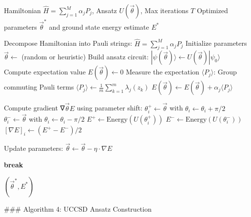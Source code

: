 \begin{algorithm}
\caption{Variational Quantum Eigensolver (VQE) with Parameter Shift Gradients}
\begin{algorithmic}[1]
\REQUIRE Hamiltonian $\hat{H} = \sum_{j=1}^M \alpha_j P_j$, Ansatz $U(\vec{\theta})$, Max iterations $T$
\ENSURE Optimized parameters $\vec{\theta}^*$ and ground state energy estimate $E^*$

\STATE Decompose Hamiltonian into Pauli strings: $\hat{H} = \sum_{j=1}^M \alpha_j P_j$
\STATE Initialize parameters $\vec{\theta} \gets$ (random or heuristic)
    \STATE Build ansatz circuit: $|\psi(\vec{\theta})\rangle \gets U(\vec{\theta}) |\psi_0\rangle$
    \STATE Compute expectation value $E(\vec{\theta}) \gets 0$
        \STATE Measure the expectation $\langle P_j \rangle$:
        \STATE \quad Group commuting Pauli terms
        \STATE \quad $\langle P_j \rangle \gets \frac{1}{m} \sum_{k=1}^{m} \lambda_j(z_k)$
        \STATE \quad $E(\vec{\theta}) \gets E(\vec{\theta}) + \alpha_j \langle P_j \rangle$
    \ENDFOR
    
    \STATE Compute gradient ∇$\vec{\theta} E$ using parameter shift:
        \STATE $\theta_i^+ \gets \vec{\theta}$ with $\theta_i \gets \theta_i + \pi/2$
        \STATE $\theta_i^- \gets \vec{\theta}$ with $\theta_i \gets \theta_i - \pi/2$
        \STATE $E^+ \gets \text{Energy}(U(\theta_i^+))$
        \STATE $E^- \gets \text{Energy}(U(\theta_i^-))$
        \STATE $[\nabla E]_i \gets (E^+ - E^-)/2$
    \ENDFOR
    
    \STATE Update parameters: $\vec{\theta} \gets \vec{\theta} - \eta \cdot \nabla E$
    
        \STATE \textbf{break}
    \ENDIF
\ENDFOR

\RETURN $(\vec{\theta}^*, E^*)$
\end{algorithmic}
\end{algorithm}

### Algorithm 4: UCCSD Ansatz Construction

